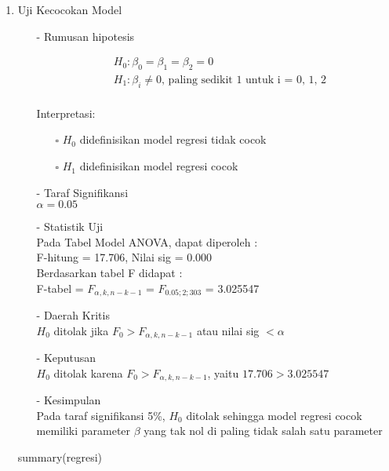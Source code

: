 \begin{enumerate}
\item Uji Kecocokan Model \\
\begin{test}{
    \begin{enumerate}
    \item[-] Rumusan hipotesis \\
    \begin{fleqn}[\parindent]
        \begin{equation*}
        \begin{split}
        &H_0 : \beta_0 = \beta_1 = \beta_2 = 0 \\ 
        &H_1 : \beta_i \neq 0 \text{, paling sedikit 1 untuk i = 0, 1, 2} \\
        \end{split}
        \end{equation*}
    \end{fleqn}
    Interpretasi:
    \begin{enumerate}
    \item[$\square$] $H_0$ didefinisikan model regresi tidak cocok
    \item[$\square$] $H_1$ didefinisikan model regresi cocok
    \end{enumerate}

    \item[-] Taraf Signifikansi \\
    $\alpha = 0.05$

    \item[-] Statistik Uji \\
    Pada Tabel Model ANOVA, dapat diperoleh : \\
    F-hitung = 17.706, Nilai sig = 0.000 \\
    Berdasarkan tabel F didapat : \\
    F-tabel = $F_{\alpha, k, n-k-1}$ = $F_{0.05; 2; 303}$ = 3.025547

    \item[-] Daerah Kritis \\
    $H_0$ ditolak jika $F_0 > F_{\alpha, k, n-k-1}$ atau nilai sig $< \alpha$

    \item[-] Keputusan \\
    $H_0$ ditolak karena $F_0 > F_{\alpha, k, n-k-1}$, yaitu $17.706 > 3.025547$

    \item[-] Kesimpulan \\
    Pada taraf signifikansi 5\%, $H_0$ ditolak sehingga model regresi cocok memiliki parameter $\beta$ yang tak nol di paling tidak salah satu parameter
\end{enumerate}
}
summary(regresi)
\end{test}


\end{enumerate}
